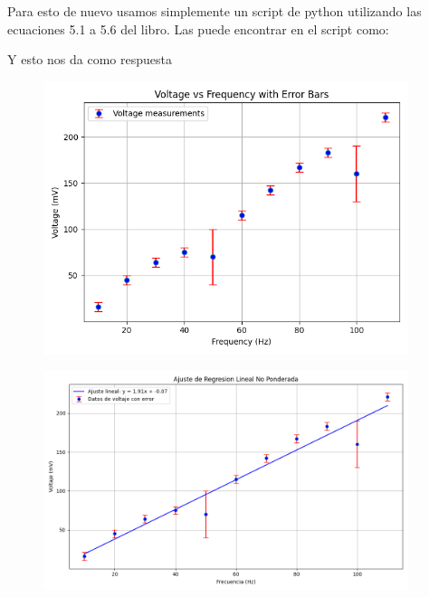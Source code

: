 \documentclass[12pt]{exam}
\begin{document}
Para esto de nuevo usamos simplemente un script de python utilizando las ecuaciones 5.1 a 5.6 del libro. Las puede encontrar en el script como:



Y esto nos da como respuesta
\begin{figure}
  \begin{center}
    \includegraphics[width=0.95\textwidth]{./code/punto_6_1_a.png}
  \end{center}
\end{figure}

\begin{figure}
  \begin{center}
    \includegraphics[width=0.95\textwidth]{./code/punto_6_1_b.png}
  \end{center}
\end{figure}
\end{document}
